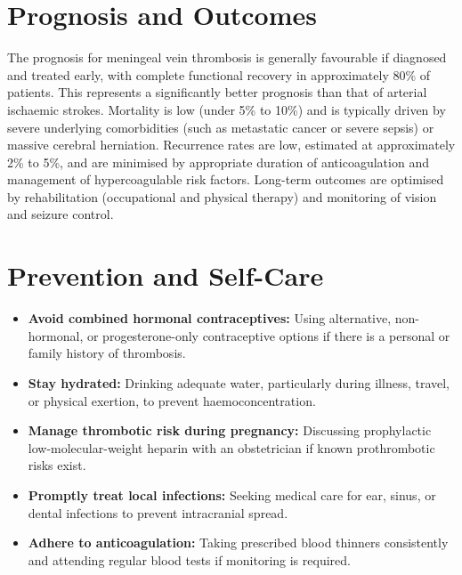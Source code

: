 \section*{Prognosis and Outcomes}
The prognosis for meningeal vein thrombosis is generally favourable if diagnosed and treated early, with complete functional recovery in approximately 80\% of patients. This represents a significantly better prognosis than that of arterial ischaemic strokes. Mortality is low (under 5\% to 10\%) and is typically driven by severe underlying comorbidities (such as metastatic cancer or severe sepsis) or massive cerebral herniation. Recurrence rates are low, estimated at approximately 2\% to 5\%, and are minimised by appropriate duration of anticoagulation and management of hypercoagulable risk factors. Long-term outcomes are optimised by rehabilitation (occupational and physical therapy) and monitoring of vision and seizure control.

\section*{Prevention and Self-Care}
\begin{itemize}
    \item \textbf{Avoid combined hormonal contraceptives:} Using alternative, non-hormonal, or progesterone-only contraceptive options if there is a personal or family history of thrombosis.
    \item \textbf{Stay hydrated:} Drinking adequate water, particularly during illness, travel, or physical exertion, to prevent haemoconcentration.
    \item \textbf{Manage thrombotic risk during pregnancy:} Discussing prophylactic low-molecular-weight heparin with an obstetrician if known prothrombotic risks exist.
    \item \textbf{Promptly treat local infections:} Seeking medical care for ear, sinus, or dental infections to prevent intracranial spread.
    \item \textbf{Adhere to anticoagulation:} Taking prescribed blood thinners consistently and attending regular blood tests if monitoring is required.
\end{itemize}


